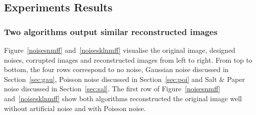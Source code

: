 \subsection{Experiments Results}
\subsubsection{Two algorithms output similar reconstructed images}
Figure~\ref{noisesnmff} and~\ref{noisesklnmff} visualise the original image, designed noises, corrupted images and reconstructed images from left to right. From top to bottom, the four rows correspond to no noise, Gaussian noise discussed in Section~\ref{sec:gau}, Poisson noise discussed in Section~\ref{sec:poi} and Salt \& Paper noise discussed in Section~\ref{sec:sal}.
The first row of Figure~\ref{noisesnmff} and~\ref{noisesklnmff} show both algorithms reconstructed the original image well without artificial noise and with Poisson noise.
